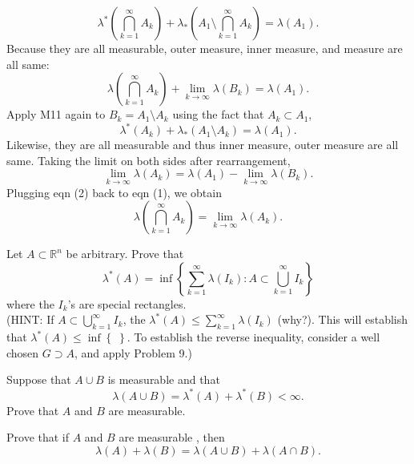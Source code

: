 \documentclass[answers]{exam}
\begin{document}
\begin{questions}
\begin{solution}
   $$
   \lambda^{*}\left(\bigcap_{k=1}^{\infty}A_{k}\right) + \lambda_{*}\left(A_{1}\setminus \bigcap_{k=1}^{\infty}A_{k}\right) = \lambda\left(A_{1}\right).
   $$
   Because they are all measurable, outer measure, inner measure, and measure are all same:
   \begin{equation}
   \lambda\left(\bigcap_{k=1}^{\infty}A_{k}\right) + \lim_{k\to\infty}\lambda\left(B_{k}\right) = \lambda\left(A_{1}\right).
   \end{equation}
   Apply M11 again to $B_{k}=A_{1}\setminus A_{k}$ using the fact that $A_{k} \subset A_{1}$,
   $$
   \lambda^{*}\left(A_{k}\right) + \lambda_{*}\left(A_{1}\setminus A_{k}\right) = \lambda\left(A_{1}\right).
   $$
   Likewise, they are all measurable and thus inner measure, outer measure are all same. Taking the limit on both sides after rearrangement,
   \begin{equation}
      \lim_{k\to\infty}\lambda\left(A_{k}\right)  = \lambda\left(A_{1}\right) - \lim_{k\to\infty} \lambda\left(B_{k}\right).
   \end{equation}
   Plugging eqn (2) back to eqn (1), we obtain
   $$
      \lambda\left(\bigcap_{k=1}^{\infty}A_{k}\right) = \lim_{k\to\infty}\lambda\left(A_{k}\right).
   $$
   \end{solution}
   \question
   Let $A \subset \mathbb{R}^{n}$ be arbitrary. Prove that
   $$
   \lambda^{*}\left(A\right) = \inf \left\{\sum_{k=1}^{\infty}\lambda\left(I_{k}\right): A \subset \bigcup_{k=1}^{\infty}I_{k} \right\}
   $$
   where the $I_{k}$'s are special rectangles.\\
   (HINT: If $A \subset \bigcup_{k=1}^{\infty} I_{k}$, the $\lambda^{*}\left(A\right)\leq \sum_{k=1}^{\infty}\lambda\left(I_{k}\right)$ (why?). This will establish that $\lambda^{*}\left(A\right) \leq \inf \left\{\; \right\}$. To establish the reverse inequality, consider a well chosen $G \supset A$, and apply Problem 9.)
   \begin{solution}

   \end{solution}
   \question
   Suppose that $A \cup B$ is measurable and that
   $$
   \lambda\left(A\cup B\right) = \lambda^{*}\left(A\right) + \lambda^{*}\left(B\right) < \infty.
   $$
   Prove that $A$ and $B$ are measurable.
   \begin{solution}

   \end{solution}
   \question
   Prove that if $A$ and $B$ are measurable , then
   $$
   \lambda\left(A\right) + \lambda\left(B\right) = \lambda\left(A\cup B\right) + \lambda\left(A\cap B\right).
   $$
   \begin{solution}


\end{solution}
\end{questions}
\end{document}
